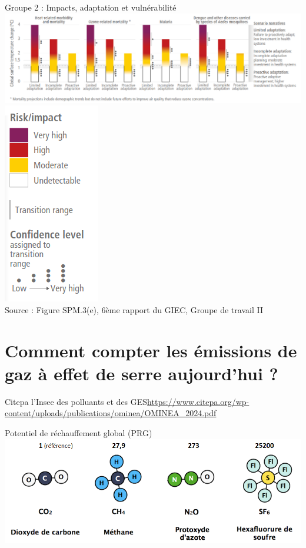 \documentclass{beamer}
\begin{document}
\begin{frame}{Groupe 2 : Impacts, adaptation et vulnérabilité}
\centering
\includegraphics[scale=0.24]{images/Health_adaptation.png}
\includegraphics[scale=0.24]{images/Legend_impact_adaptation.png}
\\
\tiny{Source : Figure SPM.3(e), 
 6ème rapport du GIEC, Groupe de travail II}
\end{frame}

\section{Comment compter les émissions de gaz à effet de serre aujourd'hui ?}

\begin{frame}{Citepa l'Insee des polluants et des GES}\url{https://www.citepa.org/wp-content/uploads/publications/ominea/OMINEA_2024.pdf}
\end{frame}

\begin{frame}{Potentiel de réchauffement global (PRG)}
\centering
\includegraphics[scale=0.35]{images/PRG.png}
\end{frame}
\end{document}
